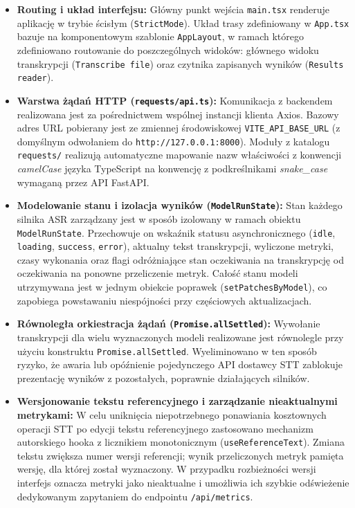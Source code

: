 \begin{itemize}
    \item \textbf{Routing i układ interfejsu:}
    Główny punkt wejścia \texttt{main.tsx} renderuje aplikację w trybie ścisłym (\texttt{StrictMode}). Układ trasy zdefiniowany w \texttt{App.tsx} bazuje na komponentowym szablonie \texttt{AppLayout}, w ramach którego zdefiniowano routowanie do poszczególnych widoków: głównego widoku transkrypcji (\texttt{Transcribe file}) oraz czytnika zapisanych wyników (\texttt{Results reader}).
    \item \textbf{Warstwa żądań HTTP (\texttt{requests/api.ts}):}
    Komunikacja z backendem realizowana jest za pośrednictwem wspólnej instancji klienta Axios. Bazowy adres URL pobierany jest ze zmiennej środowiskowej \texttt{VITE\_API\_BASE\_URL} (z domyślnym odwołaniem do \texttt{http://127.0.0.1:8000}). Moduły z katalogu \texttt{requests/} realizują automatyczne mapowanie nazw właściwości z konwencji \textit{camelCase} języka TypeScript na konwencję z podkreślnikami \textit{snake\_case} wymaganą przez API FastAPI.

    \item \textbf{Modelowanie stanu i izolacja wyników (\texttt{ModelRunState}):}
    Stan każdego silnika ASR zarządzany jest w sposób izolowany w ramach obiektu \texttt{ModelRunState}. Przechowuje on wskaźnik statusu asynchronicznego (\texttt{idle}, \texttt{loading}, \texttt{success}, \texttt{error}), aktualny tekst transkrypcji, wyliczone metryki, czasy wykonania oraz flagi odróżniające stan oczekiwania na transkrypcję od oczekiwania na ponowne przeliczenie metryk. Całość stanu modeli utrzymywana jest w jednym obiekcie poprawek (\texttt{setPatchesByModel}), co zapobiega powstawaniu niespójności przy częściowych aktualizacjach.

    \item \textbf{Równoległa orkiestracja żądań (\texttt{Promise.allSettled}):}
    Wywołanie transkrypcji dla wielu wyznaczonych modeli realizowane jest równolegle przy użyciu konstruktu \texttt{Promise.allSettled}. Wyeliminowano w ten sposób ryzyko, że awaria lub opóźnienie pojedynczego API dostawcy STT zablokuje prezentację wyników z pozostałych, poprawnie działających silników.

    \item \textbf{Wersjonowanie tekstu referencyjnego i zarządzanie nieaktualnymi metrykami:}
    W celu uniknięcia niepotrzebnego ponawiania kosztownych operacji STT po edycji tekstu referencyjnego zastosowano mechanizm autorskiego hooka z licznikiem monotonicznym (\texttt{useReferenceText}). Zmiana tekstu zwiększa numer wersji referencji; wynik przeliczonych metryk pamięta wersję, dla której został wyznaczony. W przypadku rozbieżności wersji interfejs oznacza metryki jako nieaktualne i umożliwia ich szybkie odświeżenie dedykowanym zapytaniem do endpointu \texttt{/api/metrics}.


\end{itemize}

